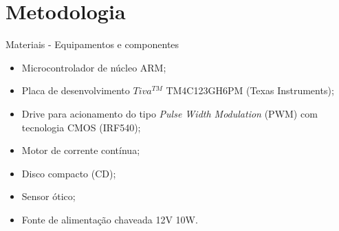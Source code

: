 \section{Metodologia}


\begin{frame}{Materiais - Equipamentos e componentes}
\begin{itemize}
\item Microcontrolador de núcleo ARM;
\item Placa de desenvolvimento $Tiva^{TM}$ TM4C123GH6PM (Texas Instruments); 
\item Drive para acionamento do tipo \emph{Pulse Width Modulation} (PWM) com tecnologia CMOS (IRF540);
\item Motor de corrente contínua;
\item Disco compacto (CD);
\item Sensor ótico;
\item Fonte de alimentação chaveada 12V 10W.
\end{itemize}
\end{frame}


